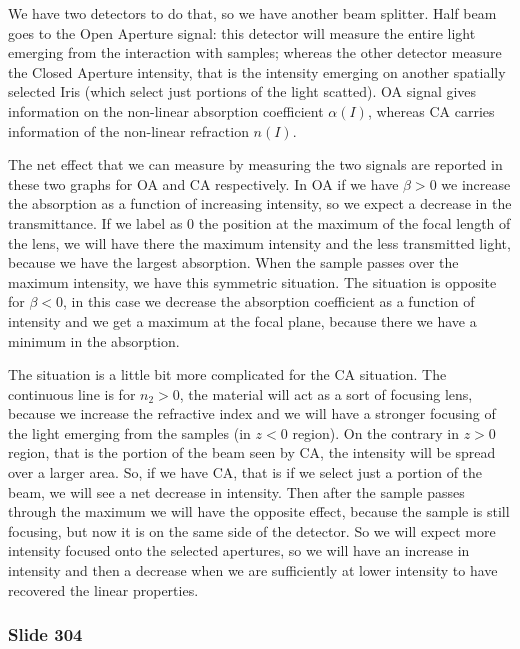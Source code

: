 \documentclass[../main/main.tex]{subfiles}
\begin{document}
We have two detectors to do that, so we have another beam splitter.  Half beam goes to the Open Aperture signal: this detector will measure the entire light emerging from the interaction with samples; whereas the other detector measure the Closed Aperture intensity, that is the intensity emerging on another spatially selected Iris (which select just portions of the light scatted). 
OA signal gives information on the non-linear absorption coefficient $\alpha(I)$, whereas CA carries information of the non-linear refraction $n(I)$.

The net effect that we can measure by measuring the two signals are reported in these two graphs for OA and CA respectively. 
In OA if we have $\beta>0$ we increase the absorption as a function of increasing intensity, so we expect a decrease in the transmittance. 
If we label as 0 the position at the maximum of the focal length of the lens, we will have there the maximum intensity and the less transmitted light, because we have the largest absorption. 
When the sample passes over the maximum intensity, we have this symmetric situation. 
The situation is opposite for $\beta<0$, in this case we decrease the absorption coefficient as a function of intensity and we get a maximum at the focal plane, because there we have a minimum in the absorption. 


The situation is a little bit more complicated for the CA situation.
The continuous line is for $n_2>0$, the material will act as a sort of focusing lens, because we increase the refractive index and we will have a stronger focusing of the light emerging from the samples (in $z<0$ region).
On the contrary in $z>0$ region, that is the portion of the beam seen by CA, the intensity will be spread over a larger area. So, if we have CA, that is if we select just a portion of the beam, we will see a net decrease in intensity. 
Then after the sample passes through the maximum we will have the opposite effect, because the sample is still focusing, but now it is on the same side of the detector. So we will expect more intensity focused onto the selected apertures, so we will have an increase in intensity and then a decrease when we are sufficiently at lower intensity to have recovered the linear properties.

\newpage

\subsubsection{Slide 304}
\end{document}
